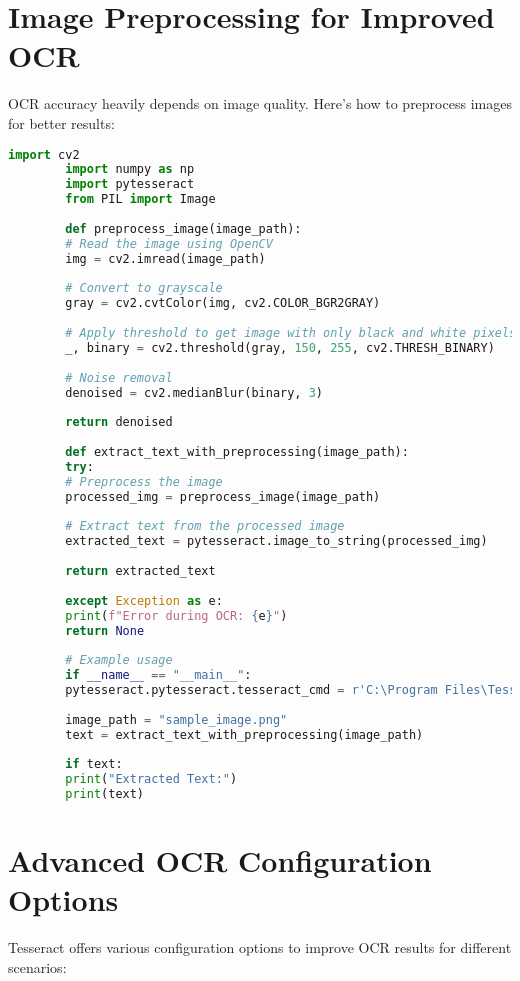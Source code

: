 \documentclass{book}
\begin{document}
	\section{Image Preprocessing for Improved OCR}
	OCR accuracy heavily depends on image quality. Here's how to preprocess images for better results:
	
	\begin{lstlisting}[language=Python]
		import cv2
		import numpy as np
		import pytesseract
		from PIL import Image
		
		def preprocess_image(image_path):
		# Read the image using OpenCV
		img = cv2.imread(image_path)
		
		# Convert to grayscale
		gray = cv2.cvtColor(img, cv2.COLOR_BGR2GRAY)
		
		# Apply threshold to get image with only black and white pixels
		_, binary = cv2.threshold(gray, 150, 255, cv2.THRESH_BINARY)
		
		# Noise removal
		denoised = cv2.medianBlur(binary, 3)
		
		return denoised
		
		def extract_text_with_preprocessing(image_path):
		try:
		# Preprocess the image
		processed_img = preprocess_image(image_path)
		
		# Extract text from the processed image
		extracted_text = pytesseract.image_to_string(processed_img)
		
		return extracted_text
		
		except Exception as e:
		print(f"Error during OCR: {e}")
		return None
		
		# Example usage
		if __name__ == "__main__":
		pytesseract.pytesseract.tesseract_cmd = r'C:\Program Files\Tesseract-OCR\tesseract.exe'
		
		image_path = "sample_image.png"
		text = extract_text_with_preprocessing(image_path)
		
		if text:
		print("Extracted Text:")
		print(text)
	\end{lstlisting}
	
	\section{Advanced OCR Configuration Options}
	Tesseract offers various configuration options to improve OCR results for different scenarios:
	
\end{document}
